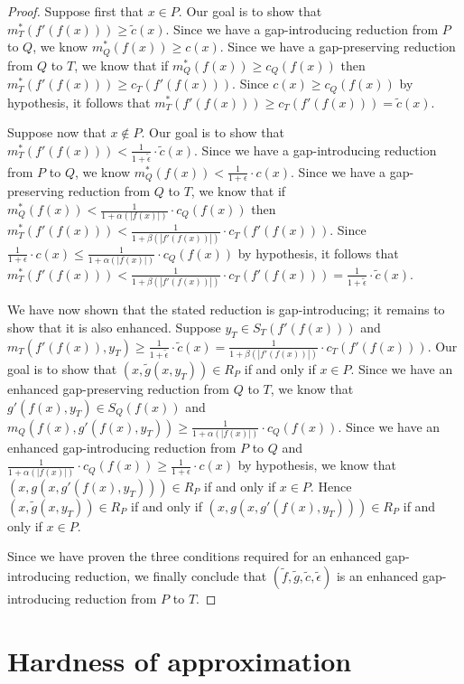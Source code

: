 \documentclass[]{article}
\theoremstyle{plain}
\theoremstyle{definition}
\begin{document}
\begin{proof}
  Suppose first that $x \in P$.
  Our goal is to show that $m^*_T(f'(f(x))) \geq \tilde{c}(x)$.
  Since we have a gap-introducing reduction from $P$ to $Q$, we know $m^*_Q(f(x)) \geq c(x)$.
  Since we have a gap-preserving reduction from $Q$ to $T$, we know that if $m^*_Q(f(x)) \geq c_Q(f(x))$ then $m^*_T(f'(f(x))) \geq c_T(f'(f(x)))$.
  Since $c(x) \geq c_Q(f(x))$ by hypothesis, it follows that $m^*_T(f'(f(x))) \geq c_T(f'(f(x))) = \tilde{c}(x)$.

  Suppose now that $x \notin P$.
  Our goal is to show that $m^*_T(f'(f(x))) < \frac{1}{1 + \tilde{\epsilon}} \cdot \tilde{c}(x)$.
  Since we have a gap-introducing reduction from $P$ to $Q$, we know $m^*_Q(f(x)) < \frac{1}{1 + \epsilon} \cdot c(x)$.
  Since we have a gap-preserving reduction from $Q$ to $T$, we know that if $m^*_Q(f(x)) < \frac{1}{1 + \alpha(|f(x)|)} \cdot c_Q(f(x))$ then $m^*_T(f'(f(x))) < \frac{1}{1 + \beta(|f'(f(x))|)} \cdot c_T(f'(f(x)))$.
  Since $\frac{1}{1 + \epsilon} \cdot c(x) \leq \frac{1}{1 + \alpha(|f(x)|)} \cdot c_Q(f(x))$ by hypothesis, it follows that $m^*_T(f'(f(x))) < \frac{1}{1 + \beta(|f'(f(x))|)} \cdot c_T(f'(f(x))) = \frac{1}{1 + \tilde{\epsilon}} \cdot \tilde{c}(x)$.

  We have now shown that the stated reduction is gap-introducing; it remains to show that it is also enhanced.
  Suppose $y_T \in S_T(f'(f(x)))$ and $m_T(f'(f(x)), y_T) \geq \frac{1}{1 + \tilde{\epsilon}} \cdot \tilde{c}(x) = \frac{1}{1 + \beta(|f'(f(x))|)} \cdot c_T(f'(f(x)))$.
  Our goal is to show that $(x, \tilde{g}(x, y_T)) \in R_P$ if and only if $x \in P$.
  Since we have an enhanced gap-preserving reduction from $Q$ to $T$, we know that $g'(f(x), y_T) \in S_Q(f(x))$ and $m_Q(f(x), g'(f(x), y_T)) \geq \frac{1}{1 + \alpha(|f(x)|)} \cdot c_Q(f(x))$.
  Since we have an enhanced gap-introducing reduction from $P$ to $Q$ and $\frac{1}{1 + \alpha(|f(x)|)} \cdot c_Q(f(x)) \geq \frac{1}{1 + \epsilon} \cdot c(x)$ by hypothesis, we know that $(x, g(x, g'(f(x), y_T))) \in R_P$ if and only if $x \in P$.
  Hence $(x, \tilde{g}(x, y_T)) \in R_P$ if and only if $(x, g(x, g'(f(x), y_T))) \in R_P$ if and only if $x \in P$.

  Since we have proven the three conditions required for an enhanced gap-introducing reduction, we finally conclude that $(\tilde{f}, \tilde{g}, \tilde{c}, \tilde{\epsilon})$ is an enhanced gap-introducing reduction from $P$ to $T$.
\end{proof}

\section{Hardness of approximation}\label{sec:hardness}
\end{document}
